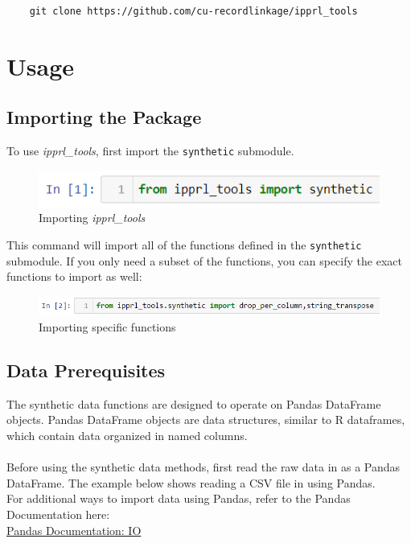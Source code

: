 \documentclass[titlepage, 11pt]{article}
\newcommand{\pkgname}{\textit{ipprl\_tools}}
\begin{document}
\begin{verbatim}
    git clone https://github.com/cu-recordlinkage/ipprl_tools
\end{verbatim}

\section{Usage}
\subsection{Importing the Package}
To use \pkgname{}, first import the \verb|synthetic| submodule. 
\begin{figure}[H]
    \centering
    \includegraphics{imgs/Import}
    \caption{Importing \pkgname{}}
    \label{fig:my_label}
\end{figure}

\noindent This command will import all of the functions defined in the \verb|synthetic| submodule. If you only need a subset of the functions, you can specify the exact functions to import as well:

\begin{figure}[H]
    \centering
    \includegraphics{imgs/Import2}
    \caption{Importing specific functions}
    \label{fig:my_label}
\end{figure}

\subsection{Data Prerequisites}
The synthetic data functions are designed to operate on Pandas DataFrame objects. Pandas DataFrame objects are data structures, similar to R dataframes, which contain data organized in named columns. 
\\
\\
\noindent Before using the synthetic data methods, first read the raw data in as a Pandas DataFrame. The example below shows reading a CSV file in using Pandas.
\\
\noindent For additional ways to import data using Pandas, refer to the Pandas Documentation here:
\\
\href{https://pandas.pydata.org/pandas-docs/stable/user_guide/io.html}{Pandas Documentation: IO}
\\
\end{document}
